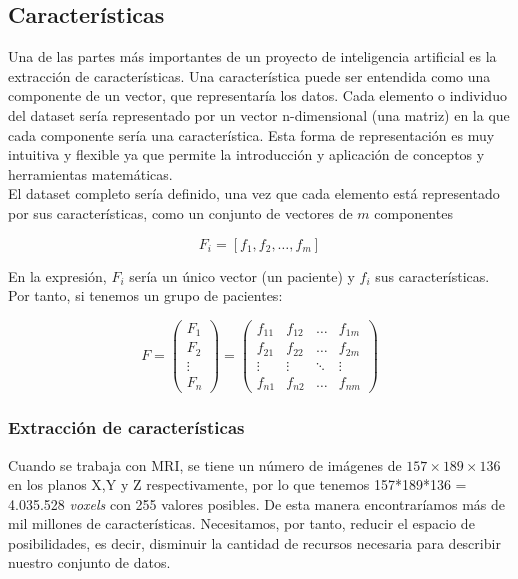 \subsection{Características}

Una de las partes más importantes de un proyecto de inteligencia artificial es la extracción de características. Una característica puede ser entendida como una componente de un vector, que representaría los datos. Cada elemento o individuo del dataset sería representado por un vector n-dimensional (una matriz) en la que cada componente sería una característica. Esta forma de representación es muy intuitiva y flexible ya que permite la introducción y aplicación de conceptos y herramientas matemáticas. \\

El dataset completo sería definido, una vez que cada elemento está representado por sus características, como un conjunto de vectores de $m$ componentes

$$F_i = [f_1,f_2,\dots,f_m]$$

En la expresión, $F_i$ sería un único vector (un paciente) y $f_i$ sus características. Por tanto, si tenemos un grupo de pacientes:

$$F =  \begin{pmatrix}
F_{1} \\
F_{2} \\
\vdots \\
F_{n}
\end{pmatrix} = \begin{pmatrix}
f_{11}& f_{12}& \dots& f_{1m} \\
f_{21}&f_{22}&\dots&f_{2m} \\
\vdots& \vdots& \ddots& \vdots \\
f_{n1}&f_{n2}&\dots&f_{nm}
\end{pmatrix}$$

\subsubsection{Extracción de características}

Cuando se trabaja con MRI, se tiene un número de imágenes de $157\times189\times136$ en los planos X,Y y Z respectivamente, por lo que tenemos 157*189*136 = 4.035.528 \textit{voxels} con 255 valores posibles. De esta manera encontraríamos más de mil millones de características. Necesitamos, por tanto, reducir el espacio de posibilidades, es decir, disminuir la cantidad de recursos necesaria para describir nuestro conjunto de datos. \\

